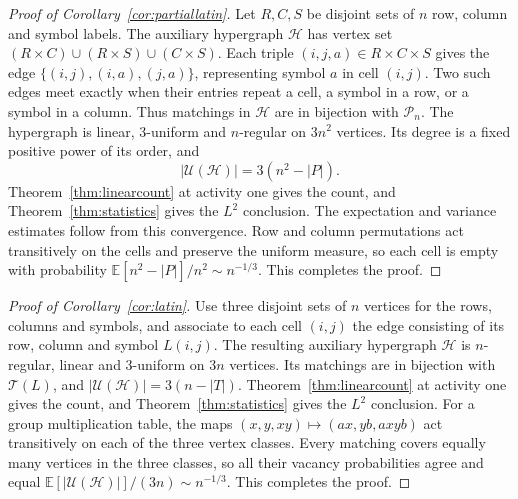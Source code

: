 \documentclass[11pt,reqno]{amsart}
\numberwithin{equation}{section}
\theoremstyle{plain}
\theoremstyle{definition}
\newcommand{\calH}{\mathcal{H}}
\newcommand{\calT}{\mathcal{T}}
\newcommand{\E}{\mathbb E}
\newcommand{\calU}{\mathcal U}
\begin{document}
\begin{proof}[Proof of Corollary~\ref{cor:partiallatin}]
    Let $R,C,S$ be disjoint sets of $n$ row, column and symbol labels.
    The auxiliary hypergraph $\calH$ has vertex set $(R\times C)\cup(R\times S)\cup(C\times S)$.
    Each triple $(i,j,a)\in R\times C\times S$ gives the edge $\{(i,j),(i,a),(j,a)\}$, representing symbol $a$ in cell $(i,j)$.
    Two such edges meet exactly when their entries repeat a cell, a symbol in a row, or a symbol in a column.
    Thus matchings in $\calH$ are in bijection with $\mathcal{P}_n$.
    The hypergraph is linear, $3$-uniform and $n$-regular on $3n^2$ vertices.
    Its degree is a fixed positive power of its order, and
    \[
        |\calU(\calH)|=3(n^2-|P|).
    \]
    Theorem~\ref{thm:linearcount} at activity one gives the count, and Theorem~\ref{thm:statistics} gives the $L^2$ conclusion.
    The expectation and variance estimates follow from this convergence.
    Row and column permutations act transitively on the cells and preserve the uniform measure, so each cell is empty with probability $\E[n^2-|P|]/n^2\sim n^{-1/3}$.
    This completes the proof.
\end{proof}

\begin{proof}[Proof of Corollary~\ref{cor:latin}]
    Use three disjoint sets of $n$ vertices for the rows, columns and symbols, and associate to each cell $(i,j)$ the edge consisting of its row, column and symbol $L(i,j)$.
    The resulting auxiliary hypergraph $\calH$ is $n$-regular, linear and $3$-uniform on $3n$ vertices.
    Its matchings are in bijection with $\calT(L)$, and $|\calU(\calH)|=3(n-|T|)$.
    Theorem~\ref{thm:linearcount} at activity one gives the count, and Theorem~\ref{thm:statistics} gives the $L^2$ conclusion.
    For a group multiplication table, the maps $(x,y,xy)\mapsto(ax,yb,axyb)$ act transitively on each of the three vertex classes.
    Every matching covers equally many vertices in the three classes, so all their vacancy probabilities agree and equal $\E[|\calU(\calH)|]/(3n)\sim n^{-1/3}$.
    This completes the proof.
\end{proof}
\end{document}
